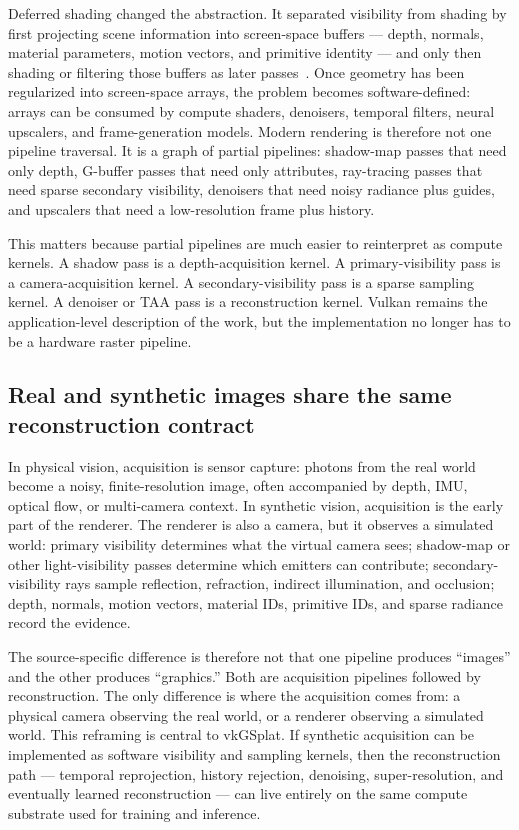 \documentclass[10pt,journal]{IEEEtran}
\begin{document}
Deferred shading changed the abstraction. It separated visibility from
shading by first projecting scene information into screen-space buffers
--- depth, normals, material parameters, motion vectors, and primitive
identity --- and only then shading or filtering those buffers as later
passes~\cite{akenine2018}. Once geometry has been regularized into
screen-space arrays, the problem becomes software-defined: arrays can
be consumed by compute shaders, denoisers, temporal filters, neural
upscalers, and frame-generation models. Modern rendering is therefore
not one pipeline traversal. It is a graph of partial pipelines:
shadow-map passes that need only depth, G-buffer passes that need only
attributes, ray-tracing passes that need sparse secondary visibility,
denoisers that need noisy radiance plus guides, and upscalers that need
a low-resolution frame plus history.

This matters because partial pipelines are much easier to reinterpret
as compute kernels. A shadow pass is a depth-acquisition kernel. A
primary-visibility pass is a camera-acquisition kernel. A
secondary-visibility pass is a sparse sampling kernel. A denoiser or TAA
pass is a reconstruction kernel. Vulkan remains the application-level
description of the work, but the implementation no longer has to be a
hardware raster pipeline.

\subsection{Real and synthetic images share the same reconstruction
contract}

In physical vision, acquisition is sensor capture: photons from the
real world become a noisy, finite-resolution image, often accompanied
by depth, IMU, optical flow, or multi-camera context. In synthetic
vision, acquisition is the early part of the renderer. The renderer is
also a camera, but it observes a simulated world: primary visibility
determines what the virtual camera sees; shadow-map or other
light-visibility passes determine which emitters can contribute;
secondary-visibility rays sample reflection, refraction, indirect
illumination, and occlusion; depth, normals, motion vectors, material
IDs, primitive IDs, and sparse radiance record the evidence.

The source-specific difference is therefore not that one pipeline
produces ``images'' and the other produces ``graphics.'' Both are
acquisition pipelines followed by reconstruction. The only difference is
where the acquisition comes from: a physical camera observing the real
world, or a renderer observing a simulated world. This reframing is
central to vkGSplat. If synthetic acquisition can be implemented as
software visibility and sampling kernels, then the reconstruction path
--- temporal reprojection, history rejection, denoising, super-resolution,
and eventually learned reconstruction --- can live entirely on the same
compute substrate used for training and inference.
\end{document}
